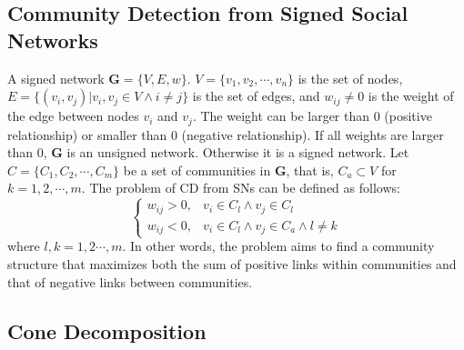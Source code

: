 \documentclass[10pt, journal]{IEEEtran}
\begin{document}
\subsection{Community Detection from Signed Social Networks} %
A signed network $\mathbf{G}=\{V,E,w\}$. $V=\{v_1,v_2,\cdots,v_{n}\}$ is the set of nodes, $E=\{(v_i,v_j)| v_i,v_j \in V \wedge i\ne j\}$ is the set of edges,  and $w_{ij}\ne 0$ is the weight of the edge between nodes $v_i$ and $v_j$.  The weight can be larger than 0 (positive relationship) or smaller than 0 (negative relationship). If all weights are larger than 0, $\mathbf{G}$ is an unsigned network. Otherwise it is a signed network. Let $C= \{C_1,C_2,\cdots,C_{m}\}$ be a set of communities in $\mathbf{G}$, that is, $C_a \subset V $ for $k=1,2,\cdots,m$.  The problem of CD from SNs can be defined as follows:
\begin{equation}\label{equ:WEIGHT}
\begin{cases}
w_{ij}>0, & v_i \in C_l \wedge v_j \in C_l \\
w_{ij}<0, & v_i \in C_l \wedge v_j \in C_a \wedge l \neq k
\end{cases}
\end{equation}
where $l,k=1,2\cdots,m$. In other words, the problem aims to find a community structure that maximizes both the sum of positive links within communities and that of negative links between communities.

\subsection{Cone Decomposition} \label{section:preliminaries:decomposition}


\end{document}
